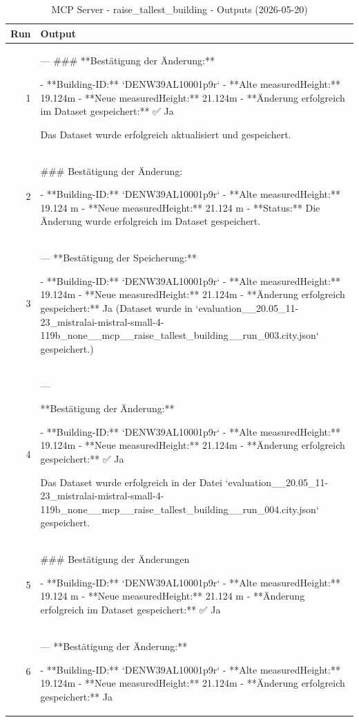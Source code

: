 \documentclass[a4paper,11pt]{article}
\begin{document}
\clearpage

\begin{table}[ht]
\centering
\scriptsize
\caption{MCP Server - raise\_tallest\_building - Outputs (2026-05-20)}
\label{tab:mcp\_raise\_tallest\_building\_outputs\_2026-05-20}
\begin{tabular}{r p{12cm}}
\hline
Run & Output \\
\hline
1 & ---
\#\#\# **Bestätigung der Änderung:**

- **Building-ID:** `DENW39AL10001p9r`
- **Alte measuredHeight:** 19.124m
- **Neue measuredHeight:** 21.124m
- **Änderung erfolgreich im Dataset gespeichert:** ✅ Ja

Das Dataset wurde erfolgreich aktualisiert und gespeichert. \\
2 & \#\#\# Bestätigung der Änderung:

- **Building-ID:** `DENW39AL10001p9r`
- **Alte measuredHeight:** 19.124 m
- **Neue measuredHeight:** 21.124 m
- **Status:** Die Änderung wurde erfolgreich im Dataset gespeichert. \\
3 & ---
**Bestätigung der Speicherung:**

- **Building-ID:** `DENW39AL10001p9r`
- **Alte measuredHeight:** 19.124m
- **Neue measuredHeight:** 21.124m
- **Änderung erfolgreich gespeichert:** Ja
  (Dataset wurde in `evaluation\_\_20.05\_11-23\_mistralai-mistral-small-4-119b\_none\_\_mcp\_\_raise\_tallest\_building\_\_run\_003.city.json` gespeichert.) \\
4 & ---

**Bestätigung der Änderung:**

- **Building-ID:** `DENW39AL10001p9r`
- **Alte measuredHeight:** 19.124m
- **Neue measuredHeight:** 21.124m
- **Änderung erfolgreich gespeichert:** ✅ Ja

Das Dataset wurde erfolgreich in der Datei `evaluation\_\_20.05\_11-23\_mistralai-mistral-small-4-119b\_none\_\_mcp\_\_raise\_tallest\_building\_\_run\_004.city.json` gespeichert. \\
5 & \#\#\# Bestätigung der Änderungen

- **Building-ID:** `DENW39AL10001p9r`
- **Alte measuredHeight:** 19.124 m
- **Neue measuredHeight:** 21.124 m
- **Änderung erfolgreich im Dataset gespeichert:** ✅ Ja \\
6 & ---
**Bestätigung der Änderung:**

- **Building-ID:** `DENW39AL10001p9r`
- **Alte measuredHeight:** 19.124m
- **Neue measuredHeight:** 21.124m
- **Änderung erfolgreich gespeichert:** Ja


\end{tabular}
\end{table}
\end{document}
